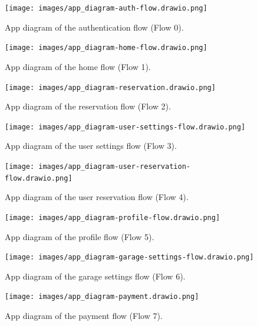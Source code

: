 \begin{appendices}
\clearpage
\begin{figure}[hpt]
    \centering
    \texttt{[image: images/app\_diagram-auth-flow.drawio.png]}
    \caption{App diagram of the authentication flow (Flow 0).}
    \label{fig:auth-flow}
\end{figure}
\begin{figure}[hpt]
    \centering
    \texttt{[image: images/app\_diagram-home-flow.drawio.png]}
    \caption{App diagram of the home flow (Flow 1).}
    \label{fig:home-flow}
\end{figure}

\clearpage

\begin{figure}[hpt]
    \centering
    \texttt{[image: images/app\_diagram-reservation.drawio.png]}
    \caption{App diagram of the reservation flow (Flow 2).}
    \label{fig:reservation-flow}
\end{figure}
\begin{figure}[hpt]
    \centering
    \texttt{[image: images/app\_diagram-user-settings-flow.drawio.png]}
    \caption{App diagram of the user settings flow (Flow 3).}
    \label{fig:user-settings-flow}
\end{figure}
\begin{figure}[!hpt]
    \centering
    \texttt{[image: images/app\_diagram-user-reservation-flow.drawio.png]}
    \caption{App diagram of the user reservation flow (Flow 4).}
    \label{fig:user-reservation-flow}
\end{figure}

\clearpage

\begin{figure}[hpt]
    \centering
    \texttt{[image: images/app\_diagram-profile-flow.drawio.png]}
    \caption{App diagram of the profile flow (Flow 5).}
    \label{fig:profile-flow}
\end{figure}
\begin{figure}[hpt]
   \centering
   \texttt{[image: images/app\_diagram-garage-settings-flow.drawio.png]}
    \caption{App diagram of the garage settings flow (Flow 6).}
   \label{fig:garage-settings-flow}
\end{figure}
\begin{figure}[!hpt]
    \centering
    \texttt{[image: images/app\_diagram-payment.drawio.png]}
    \caption{App diagram of the payment flow (Flow 7).}
    \label{fig:payment-flow}
\end{figure}

\clearpage


\end{appendices}
